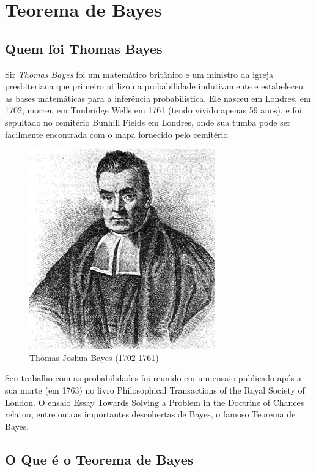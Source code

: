 \newpage
\section{Teorema de Bayes}
\subsection{Quem foi Thomas Bayes}

Sir \emph{Thomas Bayes} foi um matemático britânico e um ministro
da igreja presbiteriana que primeiro utilizou a probabilidade
indutivamente e estabeleceu as bases matemáticas para a inferência
probabilística. Ele nasceu em Londres, em 1702, morreu em
Tunbridge Wells em 1761 (tendo vivido apenas 59 anos), e foi
sepultado no cemitério Bunhill Fields em Londres, onde sua tumba
pode ser facilmente encontrada com o mapa fornecido pelo
cemitério.

\begin{figure}
    \centering
    \includegraphics[scale=0.6]{figures/Thomas_Bayes.jpeg}
    \caption{Thomas Joshua Bayes (1702-1761)}
    \label{fig:my_label2}
\end{figure}



Seu trabalho com as probabilidades foi reunido em um ensaio
publicado após a sua morte (em 1763) no livro Philosophical
Transactions of the Royal Society of London. O ensaio Essay
Towards Solving a Problem in the Doctrine of Chances relatou,
entre outras importantes descobertas de Bayes, o famoso Teorema de
Bayes.

\subsection{ O Que é o Teorema de Bayes}


